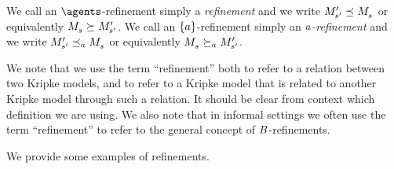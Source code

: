 We call an $\agents$-refinement simply a {\em refinement} and we write $\kPModelP{\kStateSP} \refines \kPModel{\kStateS}$ or equivalently $\kPModel{\kStateS} \simulates \kPModelP{\kStateSP}$.
We call an $\{a\}$-refinement simply an {\em $a$-refinement} and we write $\kPModelP{\kStateSP} \refinesA \kPModel{\kStateS}$ or equivalently $\kPModel{\kStateS} \simulatesA \kPModelP{\kStateSP}$.

We note that we use the term ``refinement'' both to refer to a relation between two Kripke models, and to refer to a Kripke model that is related to another Kripke model through such a relation.
It should be clear from context which definition we are using.
We also note that in informal settings we often use the term ``refinement'' to refer to the general concept of $B$-refinements.

We provide some examples of refinements.

